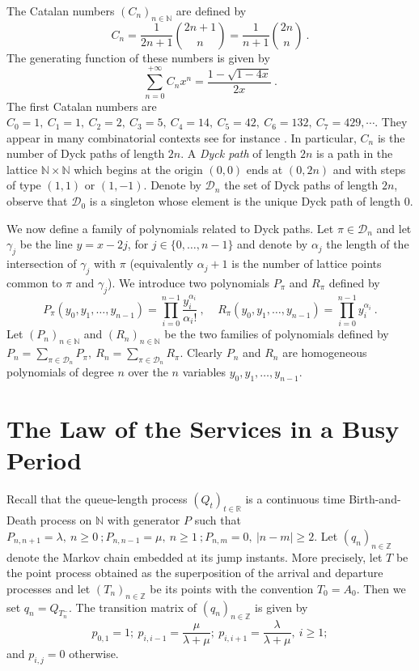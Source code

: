 \documentclass[11pt,a4paper]{article}
\numberwithin{equation}{section}
\newcommand{\D}{\mathcal{D}}
\newcommand{\R}{\mathbb{R}}
\newcommand{\1}{\mathbbm{1}}
\newcommand{\Z}{\mathbb{Z}}
\newcommand{\N}{\mathbb{N}}
\begin{document}
The Catalan numbers $(C_n)_{n\in \N}$ are defined by
\begin{equation}\label{eq-catalan}
C_n = \frac{1}{2n+1} {2n+1 \choose n}=\frac{1}{n+1} {2n\choose n}\:.
\end{equation}
The generating function of these numbers is given by
\begin{equation*}
\sum_{n=0}^{+\infty}C_nx^n=\frac{1-\sqrt{1-4x}}{2x}\:.
\end{equation*}
The first Catalan numbers are
$C_0=1,\:C_1=1,\:C_2=2,\:C_3=5,\:C_4=14,\:C_5=42
,\:C_6=132,\:C_7=429,\cdots$. They appear in many combinatorial
contexts see for instance \cite{GKPa,stan2}. In particular, $C_n$
is the number of Dyck paths of length $2n$. A {\em Dyck path}  of
length $2n$ is a  path in the lattice $\N \times \N$ which begins
at the origin $(0,0)$ ends at $(0,2n)$ and with steps of type
$(1,1)$ or $(1,-1)$. Denote by $\D_n$ the set of Dyck paths of
length $2n$, observe that $\D_0$ is a singleton whose element is
the unique Dyck path of length $0$.

We now define a family of polynomials
related to Dyck paths.
Let $\pi \in \D_n$ and let
$\gamma_j$ be the line $y=x-2j$, for $j\in \{0,\dots,n-1\}$ and denote by
$\alpha_j$ the length of the intersection of $\gamma_j$ with $\pi$
(equivalently $\alpha_j+1$ is the number of lattice points common
to $\pi$ and $\gamma_j$). We introduce two polynomials $P_{\pi}$
and $R_{\pi}$ defined by
\begin{equation}
P_{\pi}(y_0,y_1,\dots,y_{n-1}) = \prod_{i=0}^{n-1}
\frac{y_i^{\alpha_i}}{\alpha_i !}\:,\:\:\:\:\:
R_{\pi}(y_0,y_1,\dots,y_{n-1}) = \prod_{i=0}^{n-1}
y_i^{\alpha_i}\:.
\end{equation}
Let $(P_n)_{n \in \N}$  and $(R_n)_{n \in \N}$ be the two families
of polynomials defined by $P_n =\sum_{\pi \in \D_n} P_{\pi},\:R_n =\sum_{\pi\in \D_n} R_{\pi}$.
Clearly $P_n$ and $R_n$ are homogeneous polynomials of degree $n$
over the $n$ variables $y_0,y_1,\dots,y_{n-1}$.

\section{The Law of the Services in a Busy Period}
Recall that the queue-length process $(Q_t)_{t\in\R}$ is a continuous time Birth-and-Death process on $\N$ with
generator $P$ such that $P_{n,n+1}=\lambda,\:n\geq 0\:;P_{n,n-1}=\mu,\:n\geq
1\:;P_{n,m}=0,\:|n-m|\geq 2$. Let $(q_n)_{n\in\Z}$ denote the Markov chain embedded at its jump instants.
More precisely, let $T$ be the point process obtained as the superposition  of the arrival and departure processes and let $(T_n)_{n\in\Z}$
 be its points with the convention $T_0=A_0$. Then we set $q_n=Q_{T_n^-}$. The transition matrix of $(q_n)_{n\in\Z}$ is given by
\begin{equation}\label{transition}
p_{0,1}=1;\:p_{i,i-1}=\frac{\mu}{\lambda+\mu};\:p_{i,i+1}=\frac{\lambda}{\lambda+\mu},\:i\geq1;
\end{equation}
and $p_{i,j}=0$ otherwise.
\end{document}
